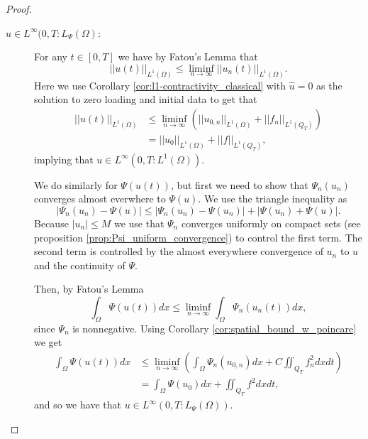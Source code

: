 \documentclass[11pt, a4paper]{article}
\begin{document}
\begin{proof}
\begin{description}
	\item[$u \in L^\infty(0,T: L_\Psi(\Omega)$:]
	For any $t \in [0,T]$ we have by Fatou's Lemma \citep[p. 162]{weiss1999course} that 
	\begin{equation*}
	||u(t)||_{L^1(\Omega)} \leq \liminf_{n \to \infty} ||u_n(t)||_{L^1(\Omega)}.
	\end{equation*}
	Here we use Corollary \ref{cor:l1-contractivity_classical} with $\hat{u}=0$ as the solution to zero loading and initial data to get that
	\begin{align}
	||u(t)||_{L^1(\Omega)} &\leq \liminf_{n \to \infty} \left( ||u_{0,n}||_{L^1(\Omega)} + ||f_n||_{L^1(Q_T)}\right) \nonumber \\
	&= ||u_0||_{L^1(\Omega)} + ||f||_{L^1(Q_T)},	
	\end{align}
	implying that $u \in L^\infty(0,T: L^1(\Omega))$.
	
	We do similarly for $\Psi(u(t))$, but first we need to show that $\Psi_n(u_n)$ converges almost everwhere to $\Psi(u)$. We use the triangle inequality as
	\begin{equation}
	|\Psi_n(u_n) - \Psi(u)| \leq |\Psi_n(u_n) - \Psi(u_n)| + |\Psi(u_n) + \Psi(u)|.
	\end{equation}
	Because $|u_n| \leq M$ we use that $\Psi_n$ converges uniformly on compact sets (see proposition \ref{prop:Psi_uniform_convergence}) to control the first term. The second term is controlled by the almost everywhere convergence of $u_n$ to $u$ and the continuity of $\Psi$.
	
	Then, by Fatou's Lemma
	\begin{equation*}
	\int_\Omega \Psi(u(t))dx \leq \liminf_{n \to \infty} \int_\Omega \Psi_n(u_n(t))dx,
	\end{equation*}
	since $\Psi_n$ is nonnegative. Using Corollary \ref{cor:spatial_bound_w_poincare} we get
	\begin{align*}
	\int_\Omega \Psi(u(t))dx &\leq \liminf_{n \to \infty} \left( \int_\Omega \Psi_n(u_{0,n})dx + C\iint_{Q_T}f_n^2 dxdt \right)\nonumber \\
	&= \int_\Omega \Psi(u_0)dx + \iint_{Q_T} f^2dxdt, 
	\end{align*}
	and so we have that $u \in L^\infty(0,T: L_\Psi(\Omega))$.



\end{description}
\end{proof}
\end{document}
